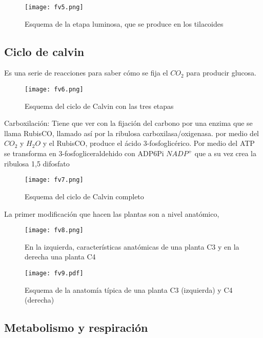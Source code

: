 \begin{figure}[h!]
\centering
  \texttt{[image: fv5.png]}
  \caption{Esquema de la etapa luminosa, que se produce en los tilacoides}
  \label{fv5}
\end{figure}

\subsection{Ciclo de calvin}

Es una serie de reacciones para saber cómo se fija el $CO_2$ para producir glucosa.

\begin{figure}[h!]
    \centering
      \texttt{[image: fv6.png]}
      \caption{Esquema del ciclo de Calvin con las tres etapas}
      \label{fv6}
    \end{figure}


Carboxilación: Tiene que ver con la fijación del carbono por una enzima que se llama RubisCO, llamado así por la ribulosa carboxilasa/oxigenasa.
por medio del $CO_2$ y $H_2O$ y el RubisCO, produce el ácido 3-fosfoglicérico.
Por medio del ATP se transforma en 3-fosfogliceraldehido con ADP6Pi $NADP^+$ que a su vez crea la ribulosa 1,5 difosfato 

\begin{figure}[h!]
    \centering
      \texttt{[image: fv7.png]}
      \caption{Esquema del ciclo de Calvin completo}
      \label{fv7}
    \end{figure}

La primer modificación que hacen las plantas son a nivel anatómico,

\begin{figure}[h!]
    \centering
      \texttt{[image: fv8.png]}
      \caption{En la izquierda, características anatómicas de una planta C3 y en la derecha una planta C4}
      \label{fv8}
\end{figure}

\begin{figure}[h!]
    \centering
      \texttt{[image: fv9.pdf]}
      \caption{Esquema de la anatomía típica de una planta C3 (izquierda) y C4 (derecha)}
      \label{fv9}
\end{figure}
\subsection{Metabolismo y respiración}

